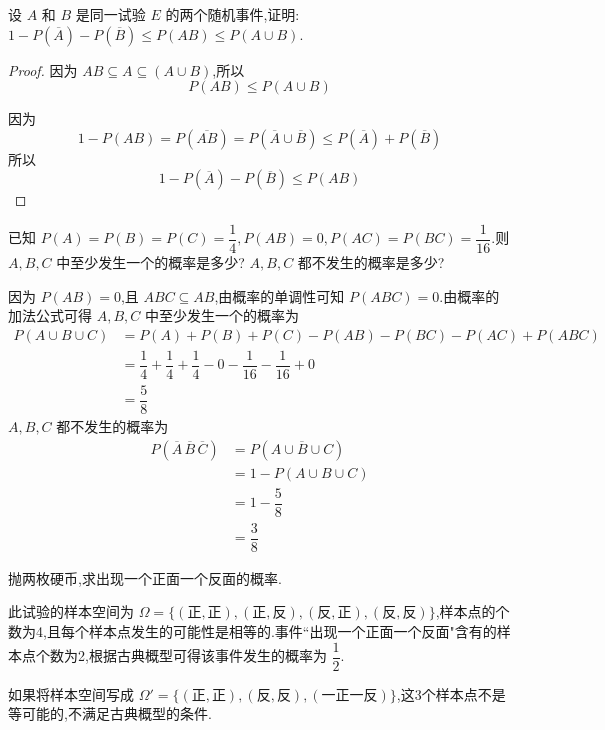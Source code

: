 \question 设 $A$ 和 $B$ 是同一试验 $E$ 的两个随机事件,证明: $1 - P(\overline{A}) - P(\overline{B}) \leqslant P(AB) \leqslant P(A \cup B)$.

\begin{proof}
    因为 $AB \subseteq A \subseteq (A \cup B)$,所以
    $$
    P(AB) \leqslant P(A \cup B)
    $$

    因为
    $$
    1 - P(AB) = P(\overline{AB}) = P(\overline{A} \cup \overline{B}) \leqslant P(\overline{A}) + P(\overline{B})
    $$
    所以
    $$
    1 - P(\overline{A}) - P(\overline{B}) \leqslant P(AB)
    $$
\end{proof}

\question 已知 $P(A) = P(B) = P(C) = \dfrac{1}{4}, P(AB) = 0, P(AC) = P(BC) = \dfrac{1}{16}$.则 $A,B,C$ 中至少发生一个的概率是多少? $A,B,C$ 都不发生的概率是多少?

\begin{solution}
    因为 $P(AB) = 0$,且 $ABC \subseteq AB$,由概率的单调性可知 $P(ABC) = 0$.由概率的加法公式可得 $A,B,C$ 中至少发生一个的概率为
    $$
    \begin{aligned}
        P(A \cup B \cup C) &= P(A) + P(B) + P(C) - P(AB) - P(BC) - P(AC) + P(ABC) \\
        &= \dfrac{1}{4} + \dfrac{1}{4} + \dfrac{1}{4} - 0 - \dfrac{1}{16} - \dfrac{1}{16} + 0 \\
        &= \dfrac{5}{8}
    \end{aligned}
    $$
    $A,B,C$ 都不发生的概率为
    $$
    \begin{aligned}
        P(\overline{A} \, \overline{B} \, \overline{C}) &= P(\overline{A \cup B \cup C}) \\
        &= 1 - P(A \cup B \cup C) \\
        &= 1 - \dfrac{5}{8} \\
        &= \dfrac{3}{8}
    \end{aligned}
    $$
\end{solution}

\question 抛两枚硬币,求出现一个正面一个反面的概率.

\begin{solution}
    此试验的样本空间为 $\varOmega = \{ (\text{正}, \text{正}), (\text{正}, \text{反}), (\text{反}, \text{正}), (\text{反}, \text{反}) \}$,样本点的个数为4,且每个样本点发生的可能性是相等的.事件``出现一个正面一个反面"含有的样本点个数为2,根据古典概型可得该事件发生的概率为 $\dfrac{1}{2}$.
\end{solution}

\begin{note}
    \indent 如果将样本空间写成 $\varOmega' = \{ (\text{正}, \text{正}), (\text{反}, \text{反}), (\text{一正一反}) \}$,这3个样本点不是等可能的,不满足古典概型的条件.
\end{note}

